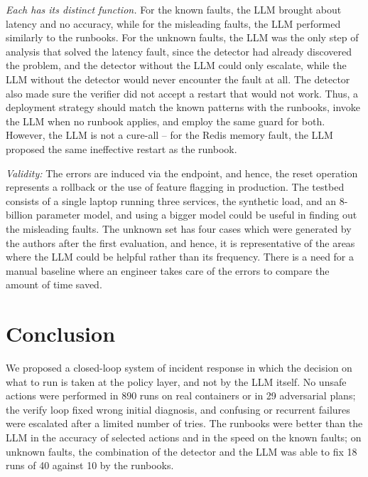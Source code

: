 \documentclass[conference,a4paper]{IEEEtran}
\begin{document}
\textit{Each has its distinct function.} For the known faults, the LLM brought about latency and no accuracy, while for the misleading faults, the LLM performed similarly to the runbooks. For the unknown faults, the LLM was the only step of analysis that solved the latency fault, since the detector had already discovered the problem, and the detector without the LLM could only escalate, while the LLM without the detector would never encounter the fault at all. The detector also made sure the verifier did not accept a restart that would not work. Thus, a deployment strategy should match the known patterns with the runbooks, invoke the LLM when no runbook applies, and employ the same guard for both. However, the LLM is not a cure-all -- for the Redis memory fault, the LLM proposed the same ineffective restart as the runbook.

\textit{Validity:} The errors are induced via the endpoint, and hence, the reset operation represents a rollback or the use of feature flagging in production. The testbed consists of a single laptop running three services, the synthetic load, and an 8-billion parameter model, and using a bigger model could be useful in finding out the misleading faults. The unknown set has four cases which were generated by the authors after the first evaluation, and hence, it is representative of the areas where the LLM could be helpful rather than its frequency. There is a need for a manual baseline where an engineer takes care of the errors to compare the amount of time saved.

\section{Conclusion}

We proposed a closed-loop system of incident response in which the decision on what to run is taken at the policy layer, and not by the LLM itself. No unsafe actions were performed in 890 runs on real containers or in 29 adversarial plans; the verify loop fixed wrong initial diagnosis, and confusing or recurrent failures were escalated after a limited number of tries. The runbooks were better than the LLM in the accuracy of selected actions and in the speed on the known faults; on unknown faults, the combination of the detector and the LLM was able to fix 18 runs of 40 against 10 by the runbooks.
\end{document}
